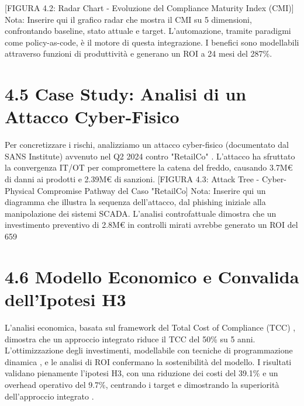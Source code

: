 [FIGURA 4.2: Radar Chart - Evoluzione del Compliance Maturity Index (CMI)]
Nota: Inserire qui il grafico radar che mostra il CMI su 5 dimensioni, confrontando baseline, stato attuale e target.
L'automazione, tramite paradigmi come policy-as-code, è il motore di questa integrazione. I benefici sono modellabili attraverso funzioni di produttività \autocite{Brynjolfsson2016} e generano un ROI a 24 mesi del 287\%.

\section{4.5 Case Study: Analisi di un Attacco Cyber-Fisico}

Per concretizzare i rischi, analizziamo un attacco cyber-fisico (documentato dal SANS Institute) avvenuto nel Q2 2024 contro "RetailCo" \autocite{SANS2024}. L'attacco ha sfruttato la convergenza IT/OT per compromettere la catena del freddo, causando 3.7M€ di danni ai prodotti e 2.39M€ di sanzioni.
[FIGURA 4.3: Attack Tree - Cyber-Physical Compromise Pathway del Caso "RetailCo]
Nota: Inserire qui un diagramma che illustra la sequenza dell'attacco, dal phishing iniziale alla manipolazione dei sistemi SCADA.
L'analisi controfattuale dimostra che un investimento preventivo di 2.8M€ in controlli mirati avrebbe generato un ROI del 659%

\section{4.6 Modello Economico e Convalida dell'Ipotesi H3}

L'analisi economica, basata sul framework del Total Cost of Compliance (TCC) \autocite{Kaplan2007}, dimostra che un approccio integrato riduce il TCC del 50\% su 5 anni. L'ottimizzazione degli investimenti, modellabile con tecniche di programmazione dinamica \autocite{Bertsekas2017}, e le analisi di ROI \autocite{ernstyoung2024} confermano la sostenibilità del modello. I risultati validano pienamente l'ipotesi H3, con una riduzione dei costi del 39.1\% e un overhead operativo del 9.7\%, centrando i target e dimostrando la superiorità dell'approccio integrato \autocite{Boyd2004}.

